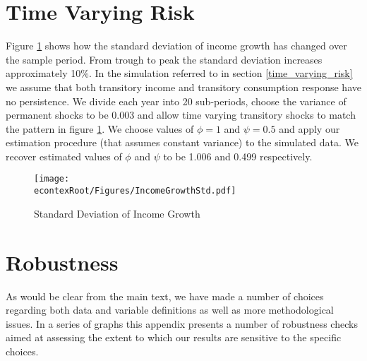 \documentclass[titlepage]{\econtex}\newcommand{\texname}{ConsumptionHeterogeneity}
\begin{document}
\section{Time Varying Risk} \label{time_varying_risk_appendix}
\setcounter{figure}{0}   
\setcounter{table}{0} 
Figure \ref{fig:income_growth_std} shows how the standard deviation of income growth has changed over the sample period. From trough to peak the standard deviation increases approximately 10\%. In the simulation referred to in section \ref{time_varying_risk} we assume that both transitory income and transitory consumption response have no persistence. We divide each year into 20 sub-periods, choose the variance of permanent shocks to be 0.003 and allow time varying transitory shocks to match the pattern in figure \ref{fig:income_growth_std}. We choose values of $\phi=1$ and $\psi=0.5$ and apply our estimation procedure (that assumes constant variance) to the simulated data. We recover estimated values of $\phi$ and $\psi$ to be 1.006 and 0.499 respectively.
\begin{figure} 
	\begin{centering}
		\texttt{[image: \\econtexRoot/Figures/IncomeGrowthStd.pdf]}
		\caption{Standard Deviation of Income Growth}
		\label{fig:income_growth_std}
	\end{centering}
\end{figure}

\section{Robustness} \label{robustness}
As would be clear from the main text, we have made a number of choices regarding both data and variable definitions as well as more methodological issues. In a series of graphs this appendix presents a number of robustness checks aimed at assessing the extent to which our results are sensitive to the specific choices. 
\end{document}
